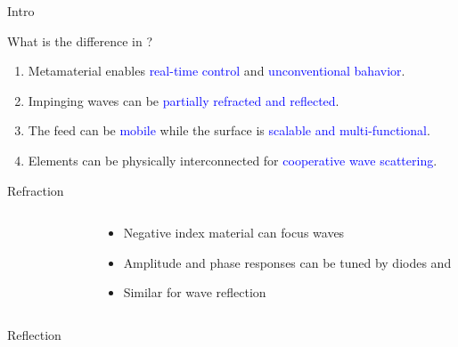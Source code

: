 \documentclass[presentation,xcolor={table},9pt]{beamer}
\begin{document}
\begin{section}{Intro}
	\begin{frame}{What is the difference in ?}
		\begin{enumerate}
			\item Metamaterial enables \textcolor{blue}{real-time control} and \textcolor{blue}{unconventional bahavior}.
			\item Impinging waves can be \textcolor{blue}{partially refracted and reflected}.
			\item The feed can be \textcolor{blue}{mobile} while the surface is \textcolor{blue}{scalable and multi-functional}.
			\item Elements can be physically interconnected for \textcolor{blue}{cooperative wave scattering}.
		\end{enumerate}
		\begin{exampleblock}{Refraction}
			\begin{columns}[T]
				\begin{column}{.25\textwidth}
					\begin{figure}
						\centering
						\resizebox{\columnwidth}{!}{
							
						}
					\end{figure}
				\end{column}
				\begin{column}{.6\textwidth}
					\vspace{0.5cm}
					\begin{itemize}
						\item Negative index material can focus waves
						\item Amplitude and phase responses can be tuned by diodes and 
						\item Similar for wave reflection
					\end{itemize}
				\end{column}
			\end{columns}
		\end{exampleblock}
		\begin{exampleblock}{Reflection}
			\vspace{-1cm}
			\begin{figure}[H]
				\centering
			\end{figure}
		\end{exampleblock}
	\end{frame}


\end{section}
\end{document}
